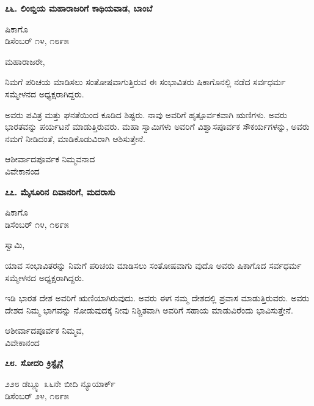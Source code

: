 \begin{center}
\textbf{೭೬. ಲಿಂಬ್ಡಿಯ ಮಹಾರಾಜರಿಗೆ ಕಾಥಿಯವಾಡ, ಬಾಂಬೆ}
\end{center}

\begin{flushright}
ಷಿಕಾಗೊ\\ಡಿಸೆಂಬರ್ ೧೪, ೧೮೯೫
\end{flushright}

ಮಹಾರಾಜರೇ,

ನಿಮಗೆ ಪರಿಚಯ ಮಾಡಿಸಲು ಸಂತೋಷವಾಗುತ್ತಿರುವ ಈ ಸಂಭಾವಿತರು ಷಿಕಾಗೊನಲ್ಲಿ ನಡೆದ ಸರ್ವಧರ್ಮ ಸಮ್ಮೇಳನದ ಅಧ್ಯಕ್ಷರಾಗಿದ್ದರು.

ಅವರು ಪವಿತ್ರ ಮತ್ತು ಘನತೆಯಿಂದ ಕೂಡಿದ ಶಿಷ್ಟರು. ನಾವು ಅವರಿಗೆ ಹೃತ್ಪೂರ್ವಕವಾಗಿ ಋಣಿಗಳು. ಅವರು ಭಾರತವನ್ನು ಪರ್ಯಟನೆ ಮಾಡುತ್ತಿರುವರು. ಮಹಾ ಸ್ವಾಮಿಗಳು ಅವರಿಗೆ ವಿಶ್ವಾಸಪೂರ್ವಕ ಸೌಕರ್ಯಗಳನ್ನು, ಅವರು ನಮಗೆ ನೀಡಿದಂತೆ, ಮಾಡಿಕೊಡುವಿರಾಗಿ ಆಶಿಸುತ್ತೇನೆ.

\begin{flushright}
ಆಶೀರ್ವಾದಪೂರ್ವಕ ನಿಮ್ಮವನಾದ\\ವಿವೇಕಾನಂದ
\end{flushright}

\begin{center}
\textbf{೭೭. ಮೈಸೂರಿನ ದಿವಾನರಿಗೆ, ಮದರಾಸು}
\end{center}

\begin{flushright}
ಷಿಕಾಗೊ\\ಡಿಸೆಂಬರ್ ೧೪, ೧೮೯೫
\end{flushright}

ಸ್ವಾಮಿ,

ಯಾವ ಸಂಭಾವಿತರನ್ನು ನಿಮಗೆ ಪರಿಚಯ ಮಾಡಿಸಲು ಸಂತೋಷವಾಗು ವುದೊ ಅವರು ಷಿಕಾಗೊದ ಸರ್ವಧರ್ಮ ಸಮ್ಮೇಳನದ ಅಧ್ಯಕ್ಷರಾಗಿದ್ದರು.

ಇಡಿ ಭಾರತ ದೇಶ ಅವರಿಗೆ ಋಣಿಯಾಗಿರುವುದು. ಅವರು ಈಗ ನಮ್ಮ ದೇಶದಲ್ಲಿ ಪ್ರವಾಸ ಮಾಡುತ್ತಿರುವರು. ಅವರು ದೇಶದ ನಿಮ್ಮ ಭಾಗವನ್ನು ನೋಡುವುದಕ್ಕೆ ನೀವು ನಿಶ್ಚಿತವಾಗಿ ಅವರಿಗೆ ಸಹಾಯ ಮಾಡುವಿರೆಂದು ಭಾವಿಸುತ್ತೇನೆ.

\begin{flushright}
ಆಶೀರ್ವಾದಪೂರ್ವಕ ನಿಮ್ಮವ,\\ವಿವೇಕಾನಂದ
\end{flushright}

\begin{center}
\textbf{೭೮. ಸೋದರಿ ಕ್ರಿಸ್ಟೈನ್ಗೆ}
\end{center}

\begin{flushright}
೨೨೮ ಡಬ್ಲ್ಯೂ ೩೬ನೇ ಬೀದಿ ನ್ಯೂಯಾರ್ಕ್\\ಡಿಸೆಂಬರ್ ೨೪, ೧೮೯೫
\end{flushright}

